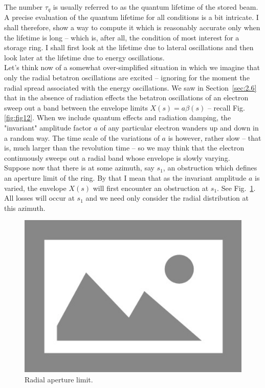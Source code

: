 The number $\tau_q$ is usually referred to as the quantum lifetime of the stored beam.\\
A precise evaluation of the quantum lifetime for all conditions is a bit intricate. I shall therefore, show a way to compute it which is reasonably accurate only when the lifetime is long -- which is, after all, the condition of most interest for a storage ring. I shall first look at the lifetime due to lateral oscillations and then look later at the lifetime due to energy oscillations.\\
Let's think now of a somewhat over-simplified situation in which we imagine that only the radial betatron oscillations are excited -- ignoring for the moment the radial spread associated with the energy oscillations. We saw in Section~\ref{sec:2.6} that in the absence of radiation effects the betatron oscillations of an electron sweep out a band between the envelope limits
 $X(s) = a\beta(s)$ -- recall Fig.\ref{fig:fig12}. When we include quantum effects and radiation
 damping, the "invariant" amplitude factor $a$ of any particular electron wanders up and down in a random way. The time scale of the variations of $a$ is however, rather slow -- that is, much
larger than the revolution time -- so we may think that the electron continuously sweeps out a radial band whose envelope is slowly varying.\\
Suppose now that there is at some azimuth, say $s_1$, an obstruction which defines an aperture
 limit of the ring. By that I mean that as the invariant amplitude $a$ is varied, the envelope $X(s)$ will first encounter an obstruction at $s_1$. See Fig.~\ref{fig:fig46}. All losses will occur at $s_1$ and we need only consider the radial distribution at this azimuth.
\begin{figure}[!htb]
	\centering
	\includegraphics[width=0.8\linewidth]{./Figuras/placeholder.png}
	\caption{Radial aperture limit.}
	\label{fig:fig46}
\end{figure}
